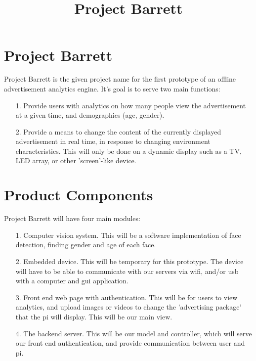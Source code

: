 \documentclass[12pt]{article}
\title{Project Barrett}
\author{}
\begin{document}
\maketitle
\doublespace
\newpage
\section{Project Barrett}
Project Barrett is the given project name for the first prototype of an offline advertisement analytics engine. It's goal is to serve two main functions:
\begin{enumerate}
\item[1.]
Provide users with analytics on how many people view the advertisement at a given time, and demographics (age, gender).
\item[2.]
Provide a means to change the content of the currently displayed advertisement in real time, in response to changing environment characteristics. This will only be done on a dynamic display such as a TV, LED array, or other 'screen'-like device.
\end{enumerate}
\section{Product Components}
Project Barrett will have four main modules:
\begin{enumerate}
\item[1.]
Computer vision system. This will be a software implementation of face detection, finding gender and age of each face.
\item[2.]
Embedded device. This will be temporary for this prototype. The device will have to be able to communicate with our servers via wifi, and/or usb with a computer and gui application.
\item[3.]
Front end web page with authentication. This will be for users to view analytics, and upload images or videos to change the 'advertising package' that the pi will display. This will be our main view.
\item[4.]
The backend server. This will be our model and controller, which will serve our front end authentication, and provide communication between user and pi.
\end{enumerate}
\end{document}
